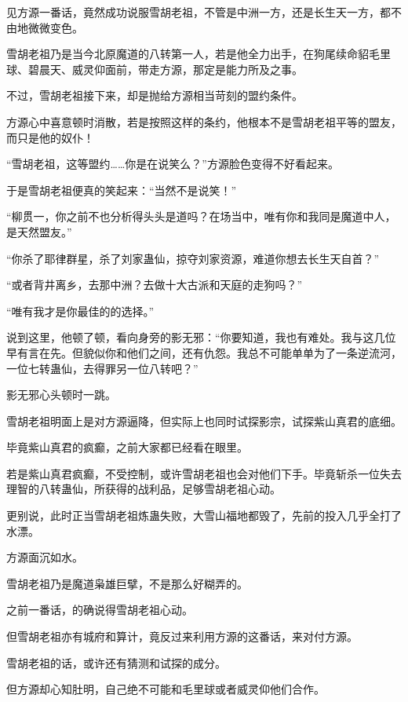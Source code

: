 
\begin{this_body}



见方源一番话，竟然成功说服雪胡老祖，不管是中洲一方，还是长生天一方，都不由地微微变色。

雪胡老祖乃是当今北原魔道的八转第一人，若是他全力出手，在狗尾续命貂毛里球、碧晨天、威灵仰面前，带走方源，那定是能力所及之事。

不过，雪胡老祖接下来，却是抛给方源相当苛刻的盟约条件。

方源心中喜意顿时消散，若是按照这样的条约，他根本不是雪胡老祖平等的盟友，而只是他的奴仆！

“雪胡老祖，这等盟约……你是在说笑么？”方源脸色变得不好看起来。

于是雪胡老祖便真的笑起来：“当然不是说笑！”

“柳贯一，你之前不也分析得头头是道吗？在场当中，唯有你和我同是魔道中人，是天然盟友。”

“你杀了耶律群星，杀了刘家蛊仙，掠夺刘家资源，难道你想去长生天自首？”

“或者背井离乡，去那中洲？去做十大古派和天庭的走狗吗？”

“唯有我才是你最佳的的选择。”

说到这里，他顿了顿，看向身旁的影无邪：“你要知道，我也有难处。我与这几位早有言在先。但貌似你和他们之间，还有仇怨。我总不可能单单为了一条逆流河，一位七转蛊仙，去得罪另一位八转吧？”

影无邪心头顿时一跳。

雪胡老祖明面上是对方源逼降，但实际上也同时试探影宗，试探紫山真君的底细。

毕竟紫山真君的疯癫，之前大家都已经看在眼里。

若是紫山真君疯癫，不受控制，或许雪胡老祖也会对他们下手。毕竟斩杀一位失去理智的八转蛊仙，所获得的战利品，足够雪胡老祖心动。

更别说，此时正当雪胡老祖炼蛊失败，大雪山福地都毁了，先前的投入几乎全打了水漂。

方源面沉如水。

雪胡老祖乃是魔道枭雄巨擘，不是那么好糊弄的。

之前一番话，的确说得雪胡老祖心动。

但雪胡老祖亦有城府和算计，竟反过来利用方源的这番话，来对付方源。

雪胡老祖的话，或许还有猜测和试探的成分。

但方源却心知肚明，自己绝不可能和毛里球或者威灵仰他们合作。


\end{this_body}
